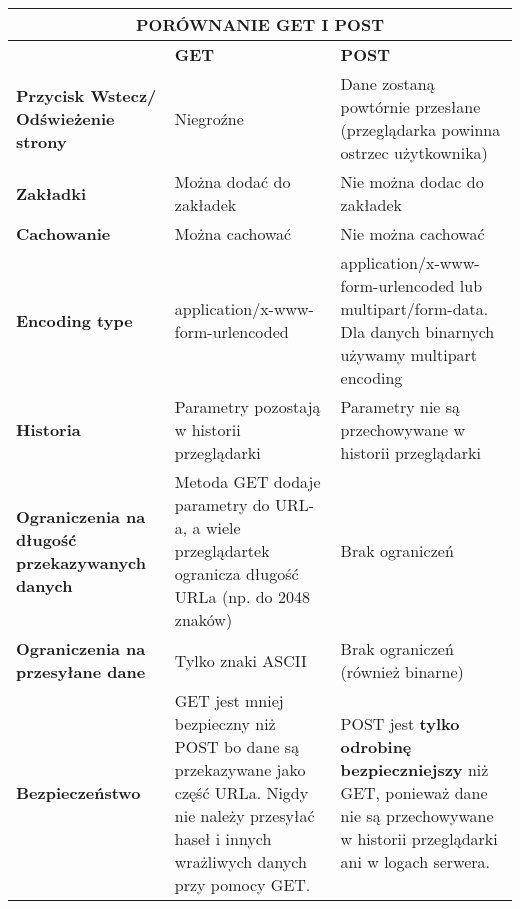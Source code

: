 \documentclass[../main.tex]{subfiles}
\begin{document}
    \begin{table}[H]
        \begin{center}
            \begin{tabular}{|p{4cm}|p{6cm}|p{6cm}|}
                \hline
                \multicolumn{3}{|c|}{\textbf{PORÓWNANIE GET I POST}}\\
                \hline
                &\textbf{GET} & \textbf{POST}\\
                \hline
                \hline
                \textbf{Przycisk Wstecz/ Odświeżenie strony} & Niegroźne &
                Dane zostaną powtórnie przesłane (przeglądarka powinna ostrzec użytkownika)\\
                \hline
                \textbf{Zakładki} & Można dodać do zakładek & Nie można dodac do zakładek\\
                \hline
                \textbf{Cachowanie} & Można cachować & Nie można cachować\\
                \hline
                \textbf{Encoding type} & application/x-www-form-urlencoded &
                application/x-www-form-urlencoded lub multipart/form-data. Dla danych binarnych używamy multipart
                encoding\\
                \hline
                \textbf{Historia} & Parametry pozostają w historii przeglądarki & Parametry nie są przechowywane w historii
                przeglądarki\\
                \hline
                \textbf{Ograniczenia na długość przekazywanych danych} & Metoda GET dodaje parametry do URL-a, a wiele
                przeglądartek ogranicza długość URLa (np. do 2048 znaków) & Brak ograniczeń\\
                \hline
                \textbf{Ograniczenia na przesyłane dane} & Tylko znaki ASCII & Brak ograniczeń (również binarne)\\
                \hline
                \textbf{Bezpieczeństwo} & GET jest mniej bezpieczny niż POST bo dane są przekazywane jako część URLa.
                Nigdy nie należy przesyłać haseł i innych wrażliwych danych przy pomocy GET. &
                POST jest \textbf{tylko odrobinę bezpieczniejszy} niż GET, ponieważ dane nie są przechowywane w historii
                przeglądarki ani w logach serwera.\\
                \hline
            \end{tabular}
        \end{center}
    \end{table}
\end{document}
